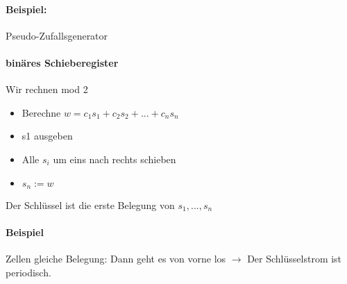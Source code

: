 


\paragraph{Beispiel:} Pseudo-Zufallsgenerator\\
\resizebox{\linewidth}{!}{}

\paragraph{binäres Schieberegister} Wir rechnen mod 2
\begin{itemize}
\item Berechne $w=c_1 s_1+c_2 s_2+...+c_n s_n$
\item s1 ausgeben
\item Alle $s_i$ um eins nach rechts schieben
\item $s_n := w$
\end{itemize}
Der Schlüssel ist die erste Belegung von $s_1, ..., s_n$

\paragraph{Beispiel}



Zellen gleiche Belegung: Dann geht es von vorne los $\rightarrow$ Der Schlüsselstrom ist periodisch. 
